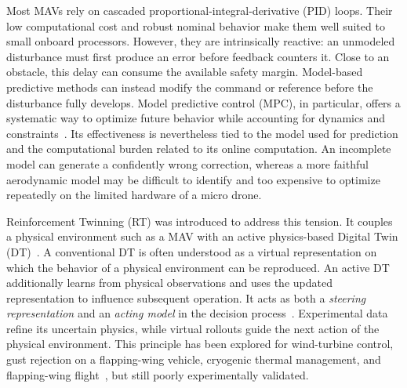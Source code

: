 \documentclass[journal]{IEEEtran}
\begin{document}
Most MAVs rely on cascaded proportional-integral-derivative (PID) loops. Their low computational cost and robust nominal behavior make them well suited to small onboard processors. However, they are intrinsically reactive: an unmodeled disturbance must first produce an error before feedback counters it. Close to an obstacle, this delay can consume the available safety margin. Model-based predictive methods can instead modify the command or reference before the disturbance fully develops. Model predictive control (MPC), in particular, offers a systematic way to optimize future behavior while accounting for dynamics and constraints~\cite{MPCReview2021}. Its effectiveness is nevertheless tied to the model used for prediction and the computational burden related to its online computation. An incomplete model can generate a confidently wrong correction, whereas a more faithful aerodynamic model may be difficult to identify and too expensive to optimize repeatedly on the limited hardware of a micro drone.

Reinforcement Twinning (RT) was introduced to address this tension. It couples a physical environment such as a MAV with an active physics-based Digital Twin (DT)~\cite{SchenaRT2023,Mendez2026,PolettiRT2025}. A conventional DT is often understood as a virtual representation on which the behavior of a physical environment can be reproduced. An active DT additionally learns from physical observations and uses the updated representation to influence subsequent operation. It acts as both a \emph{steering representation} and an \emph{acting model} in the decision process~\cite{Korenhof2021,Wagg2025}. Experimental data refine its uncertain physics, while virtual rollouts guide the next action of the physical environment. This principle has been explored for wind-turbine control, gust rejection on a flapping-wing vehicle, cryogenic thermal management, and flapping-wing flight~\cite{SchenaRT2023,PolettiRT2025}, but still poorly experimentally validated.
\end{document}
